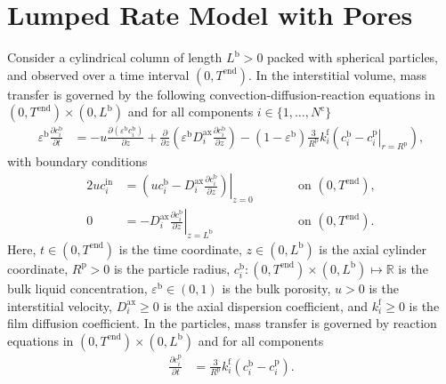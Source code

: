 \documentclass{article}
\begin{document}
\section*{Lumped Rate Model with Pores}
Consider a cylindrical column of length $L^{\mathrm{b}} > 0$ packed with spherical particles, and observed over a time interval $(0, T^{\mathrm{end}})$.
In the interstitial volume, mass transfer is governed by the following convection-diffusion-reaction equations in $(0, T^{\mathrm{end}})\times (0, L^{\mathrm{b}})$ and for all components $i\in\{1, \dots, N^{\mathrm{c}} \}$
\begin{align}
    \varepsilon^{\mathrm{b}} \frac{\partial c^{\mathrm{b}}_{i}}{\partial t}
    &= - u \frac{\partial \left( \varepsilon^{\mathrm{b}} c^{\mathrm{b}}_{i} \right)}{\partial z}
        + \frac{\partial}{\partial z} \left( \varepsilon^{\mathrm{b}} D^{\mathrm{ax}}_{i} \frac{\partial c^{\mathrm{b}}_{i}}{\partial z} \right)
        - \left(1 - \varepsilon^{\mathrm{b}} \right) \frac{3}{R^{\mathrm{p}}} k^{\mathrm{f}}_{i} \left(c^{\mathrm{b}}_{i} - \left. c^{\mathrm{p}}_{i} \right|_{r = R^{\mathrm{p}}} \right),
\end{align}
with boundary conditions
\begin{alignat}{2}
    u c^{\mathrm{in}}_{i}
    &= \left.\left( u c^{\mathrm{b}}_{i} - D^{\mathrm{ax}}_{i} \frac{\partial c^{\mathrm{b}}_{i}}{\partial z}\right)\right|_{z=0}
    & & \qquad\text{on }(0, T^{\mathrm{end}}),
    \\
    0
    &= - D^{\mathrm{ax}}_{i} \left. \frac{\partial c^{\mathrm{b}}_{i}}{\partial z} \right|_{z=L^{\mathrm{b}}}
    & & \qquad\text{on }(0, T^{\mathrm{end}}).
\end{alignat}
Here, $t\in (0, T^{\mathrm{end}})$ is the time coordinate, $z\in (0, L^{\mathrm{b}})$ is the axial cylinder coordinate, $R^{\mathrm{p}}> 0$ is the particle radius, $c^{\mathrm{b}}_{i}\colon (0, T^{\mathrm{end}})\times (0, L^{\mathrm{b}}) \mapsto \mathbb{R}$ is the bulk liquid concentration, $\varepsilon^{\mathrm{b}}\in (0, 1)$ is the bulk porosity, $u> 0$ is the interstitial velocity, $D^{\mathrm{ax}}_{i}\geq 0$ is the axial dispersion coefficient, and $k^{\mathrm{f}}_{i}\geq 0$ is the film diffusion coefficient.
In the particles, mass transfer is governed by reaction equations in $(0, T^{\mathrm{end}}) \times (0, L^{\mathrm{b}})$ and for all components
\begin{align}
    \frac{\partial c^{\mathrm{p}}_{i}}{\partial t}
    &= \frac{3}{R^{\mathrm{p}}} k^{\mathrm{f}}_{i} \left( c^{\mathrm{b}}_{i} - c^{\mathrm{p}}_{i} \right).
\end{align}
\end{document}
